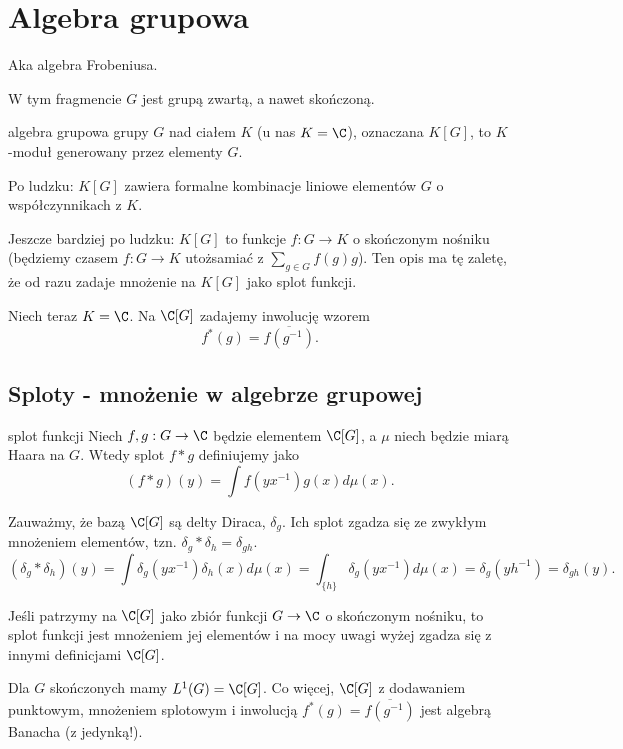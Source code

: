 \section{Algebra grupowa}
\label{algebra grupowa}

Aka algebra Frobeniusa.

W tym fragmencie $G$ jest grupą zwartą, a nawet skończoną.

\begin{definition}{algebra grupowa}{}
   grupy $G$ nad ciałem $K$ (u nas $K=\C$), oznaczana $K[G]$, to $K$-moduł generowany przez elementy $G$.
\end{definition}

Po ludzku: $K[G]$ zawiera formalne kombinacje liniowe elementów $G$ o współczynnikach z $K$.

Jeszcze bardziej po ludzku: $K[G]$ to funkcje $f:G\to K$ o skończonym nośniku (będziemy czasem $f:G\to K$ utożsamiać z $\sum_{g\in G} f(g)g$). Ten opis ma tę zaletę, że od razu zadaje mnożenie na $K[G]$ jako splot funkcji.

Niech teraz $K=\C$. Na $\C[G]$ zadajemy inwolucję wzorem
$$f^*(g)=\overline{f(g^{-1})}.$$

\subsection{Sploty - mnożenie w algebrze grupowej}

\begin{definition}{splot funkcji}{}
  Niech $f,g:G\to \C$ będzie elementem $\C[G]$, a $\mu$ niech będzie miarą Haara na $G$. Wtedy splot $f\ast g$ definiujemy jako
  $$(f\ast g)(y)=\int f(yx^{-1})g(x)d\mu(x).$$
\end{definition}

Zauważmy, że bazą $\C[G]$ są delty Diraca, $\delta_g$. Ich splot zgadza się ze zwykłym mnożeniem elementów, tzn. $\delta_g\ast\delta_h=\delta_{gh}$.
$$(\delta_g\ast\delta_h)(y)=\int \delta_g(yx^{-1})\delta_h(x)d\mu(x)=\int_{\{h\}}\delta_g(yx^{-1})d\mu(x)=\delta_g(yh^{-1})=\delta_{gh}(y).$$

Jeśli patrzymy na $\C[G]$ jako zbiór funkcji $G\to \C$ o skończonym nośniku, to splot funkcji jest mnożeniem jej elementów i na mocy uwagi wyżej zgadza się z innymi definicjami $\C[G]$.

\begin{theorem}{}{}
  Dla $G$ skończonych mamy $L^1(G)=\C[G]$. Co więcej, $\C[G]$ z dodawaniem punktowym, mnożeniem splotowym i inwolucją $f^*(g)=\overline{f(g^{-1})}$ jest algebrą Banacha (z jedynką!).
\end{theorem}

